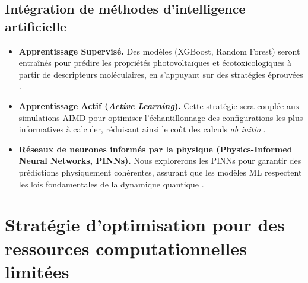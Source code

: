 \documentclass[12pt, a4paper]{article}
\begin{document}
\subsection{Intégration de méthodes d'intelligence artificielle}

\begin{itemize}
    \item \textbf{Apprentissage Supervisé.} Des modèles (XGBoost, Random Forest) seront entraînés pour prédire les propriétés photovoltaïques et écotoxicologiques à partir de descripteurs moléculaires, en s'appuyant sur des stratégies éprouvées \cite{liu2022, zhang2022_NFA}.

    \item \textbf{Apprentissage Actif (\textit{Active Learning}).} Cette stratégie sera couplée aux simulations AIMD pour optimiser l'échantillonnage des configurations les plus informatives à calculer, réduisant ainsi le coût des calculs \textit{ab initio} \cite{yati2025}.


    \item \textbf{Réseaux de neurones informés par la physique (Physics-Informed Neural Networks, PINNs).} Nous explorerons les PINNs pour garantir des prédictions physiquement cohérentes, assurant que les modèles ML respectent les lois fondamentales de la dynamique quantique \cite{Ullah2024}.
\end{itemize}

\section{Stratégie d'optimisation pour des ressources computationnelles limitées}
\end{document}
